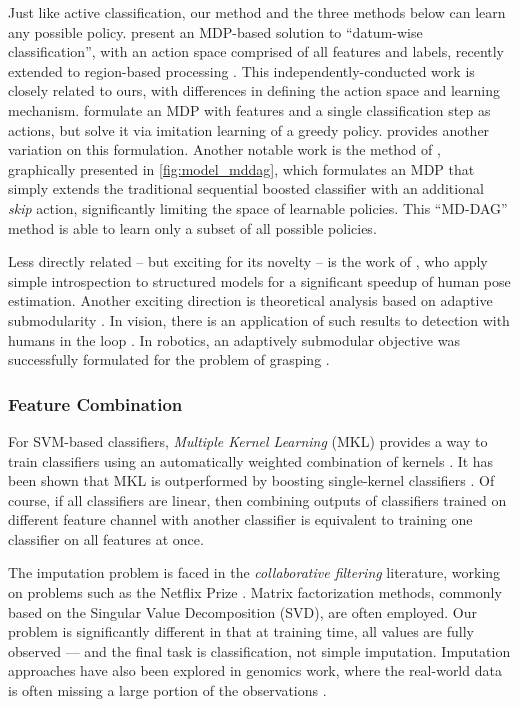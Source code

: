 Just like active classification, our method and the three methods below can learn any possible policy.
\cite{DulacArnold-ML-2012} present an MDP-based solution to ``datum-wise classification'', with an action space comprised of all features and labels, recently extended to region-based processing \parencite{DulacArnold-ICLR-2014}.
This independently-conducted work is closely related to ours, with differences in defining the action space and learning mechanism.
\cite{HeHe-ICMLW-2012} formulate an MDP with features and a single classification step as actions, but solve it via imitation learning of a greedy policy.
\cite{Trapeznikov-ML-2012} provides another variation on this formulation.
Another notable work is the method of \cite{Benbouzid-ICML-2012}, graphically presented in \autoref{fig:model_mddag}, which formulates an MDP that simply extends the traditional sequential boosted classifier with an additional \emph{skip} action, significantly limiting the space of learnable policies.
This ``MD-DAG'' method is able to learn only a subset of all possible policies.

Less directly related -- but exciting for its novelty -- is the work of \parencite{Weiss-ICCV-2013}, who apply simple introspection to structured models for a significant speedup of human pose estimation.
Another exciting direction is theoretical analysis based on adaptive submodularity \parencite{Golovin-and-Krause-2010-JAIR}.
In vision, there is an application of such results to detection with humans in the loop \parencite{Chen-2014-ICML}.
In robotics, an adaptively submodular objective was successfully formulated for the problem of grasping \parencite{Javdani2012}.

\subsubsection{Feature Combination}

For SVM-based classifiers, \emph{Multiple Kernel Learning} (MKL) provides a way to train classifiers using an automatically weighted combination of kernels \parencite{Lanckriet2004}.
It has been shown that MKL is outperformed by boosting single-kernel classifiers \parencite{Gehler2009}.
Of course, if all classifiers are linear, then combining outputs of classifiers trained on different feature channel with another classifier is equivalent to training one classifier on all features at once.

The imputation problem is faced in the \emph{collaborative filtering} literature, working on problems such as the Netflix Prize \parencite{Koren-2009}.
Matrix factorization methods, commonly based on the Singular Value Decomposition (SVD), are often employed.
Our problem is significantly different in that at training time, all values are fully observed --- and the final task is classification, not simple imputation.
Imputation approaches have also been explored in genomics work, where the real-world data is often missing a large portion of the observations \parencite{Hastie-1999}.

